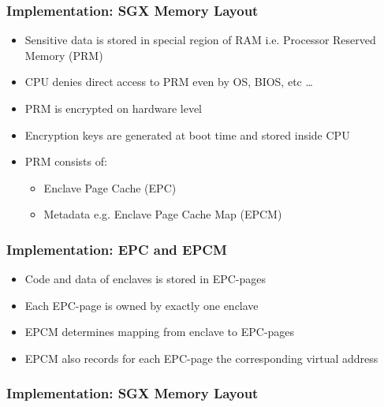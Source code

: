 \begin{frame}
    \frametitle{Implementation: SGX Memory Layout}
    \begin{itemize}[<+->]
        \item Sensitive data is stored in special region of RAM i.e. Processor Reserved Memory (PRM)
        \item CPU denies direct access to PRM even by OS, BIOS, etc \dots
        \item PRM is encrypted on hardware level
        \item Encryption keys are generated at boot time and stored inside CPU
        \item PRM consists of:
        \begin{itemize}
            \item Enclave Page Cache (EPC)
            \item Metadata e.g. Enclave Page Cache Map (EPCM)
        \end{itemize}
    \end{itemize}
\end{frame}

\begin{frame}
    \frametitle{Implementation: EPC and EPCM}
    \begin{itemize}[<+->]
        \item Code and data of enclaves is stored in EPC-pages
        \item Each EPC-page is owned by exactly one enclave
        \item EPCM determines mapping from enclave to EPC-pages
        \item EPCM also records for each EPC-page the corresponding virtual address
    \end{itemize}
\end{frame}

\begin{frame}
    \frametitle{Implementation: SGX Memory Layout}
    \centering
\end{frame}

